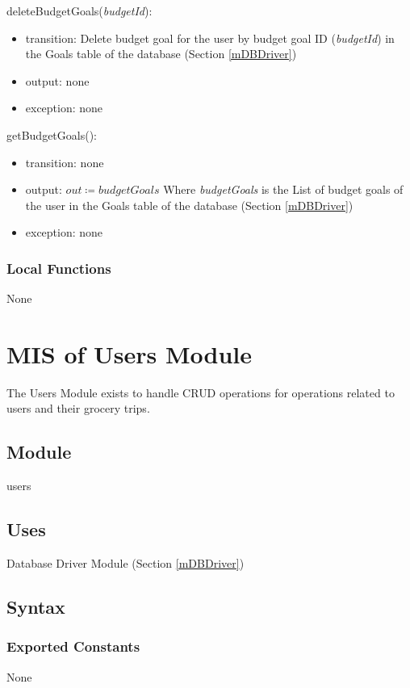 \documentclass[12pt, titlepage]{article}
\begin{document}
\noindent deleteBudgetGoals(\textit{budgetId}):
\begin{itemize}
\item transition: Delete budget goal for the user by budget goal ID (\textit{budgetId}) in the Goals table of the database (Section \ref{mDBDriver})
\item output: none
\item exception: none
\end{itemize}

\noindent getBudgetGoals():
\begin{itemize}
\item transition: none
\item output: \( \textit{out} \coloneqq budgetGoals \) Where \textit{budgetGoals} is the List of budget goals of the user in the Goals table of the database (Section \ref{mDBDriver})
\item exception: none
\end{itemize}


\subsubsection{Local Functions}
None

\newpage

\section{MIS of Users Module} \label{mUsers} 
The Users Module exists to handle CRUD operations for operations related to users and their grocery trips.

\subsection{Module}

users

\subsection{Uses}

Database Driver Module (Section \ref{mDBDriver}) 

\subsection{Syntax}

\subsubsection{Exported Constants}
None
\end{document}
